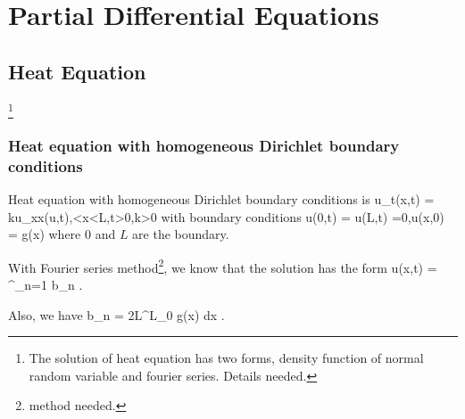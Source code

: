\chapter{Partial Differential Equations}

\section{Heat Equation}

\footnote{The solution of heat equation has two forms, density function of normal random variable and fourier series. Details needed.}

\subsection{Heat equation with homogeneous Dirichlet boundary conditions}

Heat equation with homogeneous Dirichlet boundary conditions is \be u_t(x,t) = ku_{xx}(u,t),<x<L,t>0,k>0 \ee with boundary conditions \be u(0,t) = u(L,t) =0,\quad u(x,0) = g(x) \ee where 0 and $L$ are the boundary.

With Fourier series method\footnote{method needed.}, we know that the solution has the form \be u(x,t) = \sum^\infty_{n=1} b_n \exp{} \sin{}.\ee

Also, we have \be b_n = \frac 2L\int^L_0 g(x) \sin{} dx .\ee



